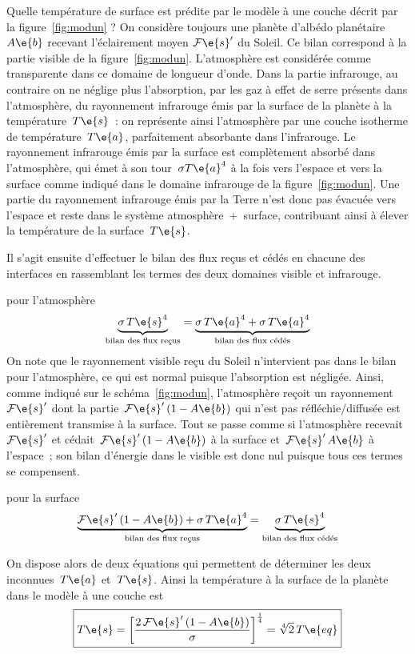 \sk
Quelle température de surface est prédite par le modèle à une couche décrit par la figure~\ref{fig:modun} ? On considère toujours une planète d'albédo planétaire $A\e{b}$ recevant l'éclairement moyen $\mathcal{F}\e{s}'$ du Soleil. Ce bilan correspond à la partie visible de la figure~\ref{fig:modun}. L'atmosphère est considérée comme transparente dans ce domaine de longueur d'onde. Dans la partie infrarouge, au contraire on ne néglige plus l'absorption, par les gaz à effet de serre présents dans l'atmosphère, du rayonnement infrarouge émis par la surface de la planète à la température~$T\e{s}$~: on représente ainsi l'atmosphère par une couche isotherme de température~$T\e{a}$, parfaitement absorbante dans l'infrarouge. Le rayonnement infrarouge émis par la surface est complètement absorbé dans l'atmosphère, qui émet à son tour~$\sigma {T\e{a}}^4$ à la fois vers l'espace et vers la surface comme indiqué dans le domaine infrarouge de la figure~\ref{fig:modun}. Une partie du rayonnement infrarouge émis par la Terre n'est donc pas évacuée vers l'espace et reste  dans le système atmosphère~+~surface, contribuant ainsi à élever la température de la surface~$T\e{s}$.


\sk
Il s'agit ensuite d'effectuer le bilan des flux reçus et cédés en chacune des interfaces en rassemblant les termes des deux domaines visible et infrarouge.
\begin{finger}
\item pour l'atmosphère
\[ \underbrace{\sigma \, {T\e{s}}^4}_{\text{bilan des flux reçus}} = \underbrace{\sigma \, {T\e{a}}^4 + \sigma \, {T\e{a}}^4}_{\text{bilan des flux cédés}} \] 
On note que le rayonnement visible reçu du Soleil n'intervient pas dans le bilan pour l'atmosphère, ce qui est normal puisque l'absorption est négligée. Ainsi, comme indiqué sur le schéma~\ref{fig:modun}, l'atmosphère reçoit un rayonnement~$\mathcal{F}\e{s}'$ dont la partie~$\mathcal{F}\e{s}'\,(1-A\e{b})$ qui n'est pas réfléchie/diffusée est entièrement transmise à la surface. Tout se passe comme si l'atmosphère recevait~$\mathcal{F}\e{s}'$ et cédait~$\mathcal{F}\e{s}'\,(1-A\e{b})$ à la surface et~$\mathcal{F}\e{s}'\,A\e{b}$ à l'espace~; son bilan d'énergie dans le visible est donc nul puisque tous ces termes se compensent.
\item pour la surface
\[ \underbrace{\mathcal{F}\e{s}'\,(1-A\e{b}) + \sigma \, {T\e{a}}^4}_{\text{bilan des flux reçus}} = \underbrace{\sigma \, {T\e{s}}^4}_{\text{bilan des flux cédés}} \]
\end{finger}
On dispose alors de deux équations qui permettent de déterminer les deux inconnues~$T\e{a}$ et~$T\e{s}$. Ainsi la température à la surface de la planète dans le modèle à une couche est 
\[ \boxed{ T\e{s} = \bigg[ \frac{ 2 \, \mathcal{F}\e{s}'\,(1-A\e{b}) }{ \sigma } \bigg]^{\frac{1}{4}} = \sqrt[4]{2} \, T\e{eq} } \]

